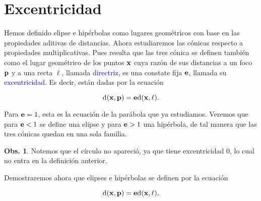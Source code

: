 \documentclass{article}
\theoremstyle{definicion}
\theoremstyle{definition}             %
\theoremstyle{definition}             %
\theoremstyle{definition}
\theoremstyle{definition}
\theoremstyle{observacion}
\newtheorem{obs}{Obs.}
\theoremstyle{definition}
\theoremstyle{plain}
\theoremstyle{definition}
\theoremstyle{afirmacion}
\theoremstyle{notation}
\theoremstyle{definition}
\begin{document}


    \section{Excentricidad}

    Hemos definido elipse e hipérbolas como lugares geométricos con base en las propiedades aditivas de distancias. Ahora estudiaremos las cónicas respecto a propiedades multiplicativas. Pues resulta que las tres cónica se definen también como el lugar geométrico de los puntos \(\vb{x}\) cuya razón de sus distancias a un foco \(\vb{p}\) y a una recta \(\ell\), llamada \textcolor{blue}{directriz}, es una constate fija \(\vb{e}\), llamada su \textcolor{blue}{excentricidad}. Es decir, están dadas por la ecuación
    
    \begin{equation*}
        \textrm{d}(\vb{x}, \vb{p}) = \vb{e} \textrm{d}(\vb{x}, \ell).
    \end{equation*}

    Para \(\vb{e} = 1\), esta es la ecuación de la parábola que ya estudiamos. Veremos que para \(\vb{e} < 1\) se define una elipse y para \(\vb{e} > 1\) una hipérbola, de tal manera que las tres cónicas quedan en una sola familia.

    \begin{obs}
        Notemos que el círculo no apareció, ya que tiene excentricidad \(0\), lo cual no entra en la definición anterior.
    \end{obs}

    Demostraremos ahora que elipses e hipérbolas se definen por la ecuación

    \begin{equation*}
        \textrm{d}(\vb{x}, \vb{p}) = \vb{e} \textrm{d}(\vb{x}, \ell),    
    \end{equation*}
\end{document}
